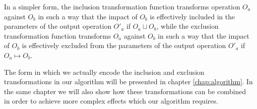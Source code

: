 In a simpler form, the inclusion transformation function transforms operation $O_{a}$
against $O_{b}$ in such a way that the impact of $O_{b}$ is effectively included in the
parameters of the output operation $O'_{a}$ if $O_{a} \sqcup O_{b}$, while the exclusion
transformation function transforms $O_{a}$ against $O_{b}$ in such a way that the impact
of $O_{b}$ is effectively excluded from the parameters of the output operation $O'_{a}$
if $O_{a} \mapsto O_{b}$.

The form in which we actually encode the inclusion and exclusion transformations in our
algorithm will be presented in chapter \ref{chap:algorithm}. In the same chapter we will
also show how these transformations can be combined in order to achieve more complex
effects which our algorithm requires.
